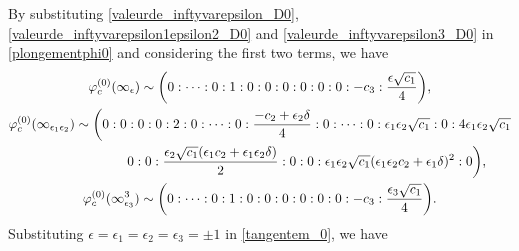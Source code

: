 \documentclass[pdftex]{sigma}
\numberwithin{equation}{section}
\begin{document}
By substituting \eqref{valeurde_inftyvarepsilon_D0},
\eqref{valeurde_inftyvarepsilon1epsilon2_D0} and
\eqref{valeurde_inftyvarepsilon3_D0} in \eqref{plongementphi0} and
considering the first two terms, we have
\begin{gather}
 \varphi_c^{ (0 )} (\infty_\epsilon ) \sim \biggl(0: \dots: 0: 1: 0: 0: 0: 0: 0: 0:- c_3:\frac{\epsilon \sqrt{c_1}}{4} \biggr),\nonumber\\
 \varphi_c^{ (0 )} (\infty_{\epsilon_1\epsilon_2} ) \sim \biggl(0:0:0:0:2:0:\cdots:0: \frac{-c_2+\epsilon_2\delta}{4}:0:\cdots:0: \epsilon_1\epsilon_2\sqrt{c_1}:0:4\epsilon_1\epsilon_2\sqrt{ c_1} \nonumber\\ \hphantom{\varphi_c^{ (0 )} (\infty_{\epsilon_1\epsilon_2} ) \sim \biggl(}{}
 0:0:\frac{\epsilon_2\sqrt{c_1} (\epsilon_1c_2+\epsilon_1\epsilon_2\delta )}{2}:0:0:\epsilon_1\epsilon_2\sqrt{c_1} (\epsilon_1\epsilon_2c_2+\epsilon_1\delta)^2:0 \biggr) , \nonumber\\
 \varphi_c^{ (0 )} (\infty^3_{\epsilon_3} ) \sim \biggl(0:\dots: 0: 1: 0: 0: 0: 0: 0: 0:-c_3:\frac{\epsilon_3\sqrt{c_1}}{4} \biggr).\label{tangentem_0}
\end{gather}
Substituting $\epsilon=\epsilon_1=\epsilon_2=\epsilon_3=\pm 1$ in
\eqref{tangentem_0}, we have
\end{document}
